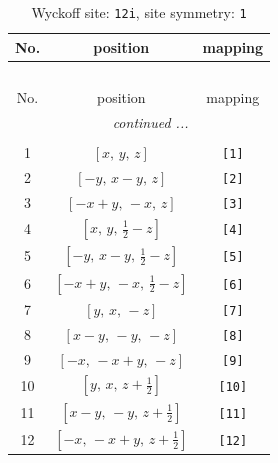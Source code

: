 \documentclass[fleqn,8pt]{jsarticle}
\begin{document}
\renewcommand{\arraystretch}{1.2}
\begin{longtable}{ccc}
\caption{Wyckoff site: {\tt 12i}, site symmetry: {\tt 1}}
 \\
 \hline \hline
No. & position & mapping \\ \hline \endfirsthead

\multicolumn{2}{l}{\tablename\ \thetable{}} \\
 \hline \hline
No. & position & mapping \\ \hline \endhead

 \hline \hline
\multicolumn{2}{r}{\footnotesize\it continued ...} \\ \endfoot

 \hline \hline
\multicolumn{2}{r}{} \\ \endlastfoot

1 & $\left[ x,\, y,\, z \right]$ & {\tt [1]} \\ \hline
2 & $\left[ - y,\, x - y,\, z \right]$ & {\tt [2]} \\ \hline
3 & $\left[ - x + y,\, - x,\, z \right]$ & {\tt [3]} \\ \hline
4 & $\left[ x,\, y,\, \frac{1}{2} - z \right]$ & {\tt [4]} \\ \hline
5 & $\left[ - y,\, x - y,\, \frac{1}{2} - z \right]$ & {\tt [5]} \\ \hline
6 & $\left[ - x + y,\, - x,\, \frac{1}{2} - z \right]$ & {\tt [6]} \\ \hline
7 & $\left[ y,\, x,\, - z \right]$ & {\tt [7]} \\ \hline
8 & $\left[ x - y,\, - y,\, - z \right]$ & {\tt [8]} \\ \hline
9 & $\left[ - x,\, - x + y,\, - z \right]$ & {\tt [9]} \\ \hline
10 & $\left[ y,\, x,\, z + \frac{1}{2} \right]$ & {\tt [10]} \\ \hline
11 & $\left[ x - y,\, - y,\, z + \frac{1}{2} \right]$ & {\tt [11]} \\ \hline
12 & $\left[ - x,\, - x + y,\, z + \frac{1}{2} \right]$ & {\tt [12]} \\
\end{longtable}
\end{document}
